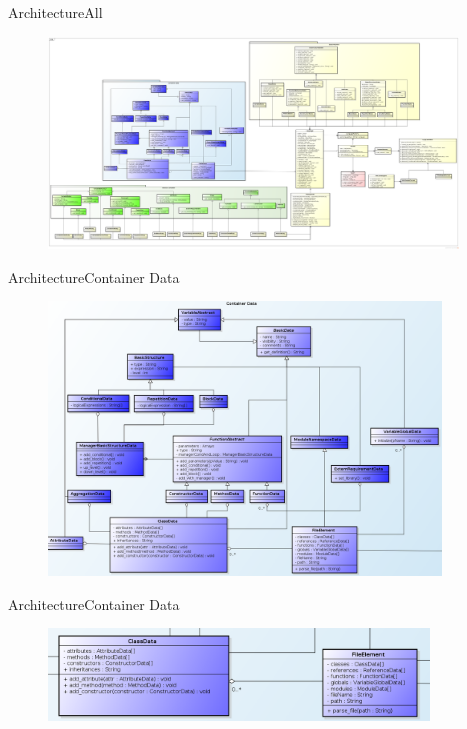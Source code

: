 \documentclass[10pt]{beamer}
\begin{document}
\begin{frame}{Architecture}{All}
  \begin{figure}[all]
    \includegraphics[width=0.97\textwidth]{images/OverviewClasses.png}
  \end{figure}
\end{frame}

\begin{frame}{Architecture}{Container Data}
  \begin{figure}[containerdata]
    \includegraphics[width=0.93\textwidth]{images/ContainerData.png}
  \end{figure}
\end{frame}

\begin{frame}{Architecture}{Container Data}
  \begin{figure}[classAndFileElement]
    \includegraphics[width=0.9\textwidth]{images/classAndFileElementData.png}
  \end{figure}
\end{frame}
\end{document}
